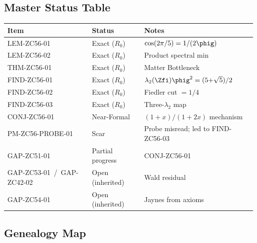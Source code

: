 \documentclass[12pt, a4paper]{article}
\begin{document}
\subsection{Master Status Table}

\begin{center}
\begin{tabular}{@{}lp{4.5cm}p{4cm}@{}}
\toprule
\textbf{Item} & \textbf{Status} & \textbf{Notes} \\
\midrule
LEM-ZC56-01 & Exact ($R_0$) & $\cos(2\pi/5)=1/(2\phig)$ \\
LEM-ZC56-02 & Exact ($R_0$) & Product spectral min \\
THM-ZC56-01 & Exact ($R_0$) & Matter Bottleneck \\
FIND-ZC56-01 & Exact ($R_0$) & $\lambda_2(\Zfi)\phig^2=(5{+}\sqrt{5})/2$ \\
FIND-ZC56-02 & Exact ($R_0$) & Fiedler cut $=1/4$ \\
FIND-ZC56-03 & Exact ($R_0$) & Three-$\lambda_2$ map \\
CONJ-ZC56-01 & Near-Formal & $(1{+}x)/(1{+}2x)$ mechanism \\
PM-ZC56-PROBE-01 & Scar & Probe misread; led to FIND-ZC56-03 \\
\midrule
GAP-ZC51-01 & Partial progress & CONJ-ZC56-01 \\
GAP-ZC53-01~/~GAP-ZC42-02 & Open (inherited) & Wald residual \\
GAP-ZC54-01 & Open (inherited) & Jaynes from axioms \\
\bottomrule
\end{tabular}
\end{center}

\subsection{Genealogy Map}
\end{document}
